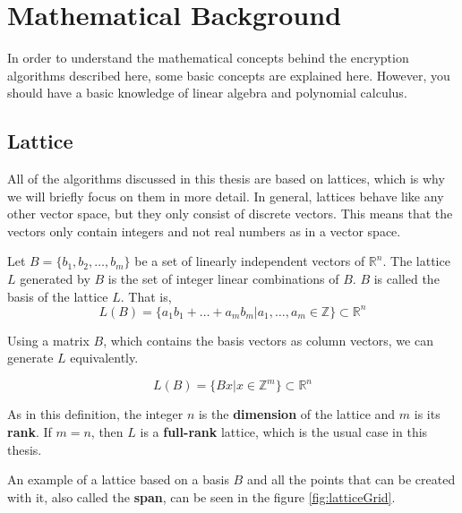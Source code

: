 \chapter{Mathematical Background}
\label{MathBack}

In order to understand the mathematical concepts behind the encryption algorithms described here, some basic concepts are explained here. However, you should have a basic knowledge of linear algebra and polynomial calculus.

\section{Lattice}


All of the algorithms discussed in this thesis are based on lattices, which is why we will briefly focus on them in more detail. In general, lattices behave like any other vector space, but they only consist of discrete vectors. This means that the vectors only contain integers and not real numbers as in a vector space.

Let $B = \{b_1, b_2, \ldots, b_m\}$ be a set of linearly independent vectors of $\mathbb{R}^n$. The lattice $L$ generated by $B$ is the set of integer linear combinations of $B$. $B$ is called the basis of the lattice $L$. That is,
$$L(B) = \{a_1b_1 + \ldots + a_mb_m | a_1, \ldots, a_m \in \mathbb{Z}  \} \subset \mathbb{R}^n$$


Using a matrix $B$, which contains the basis vectors as column vectors, we can generate $L$ equivalently.

$$L(B) = \{Bx | x \in \mathbb{Z}^m  \} \subset \mathbb{R}^n$$

As in this definition, the integer $n$ is the \textbf{dimension} of the lattice and $m$ is its \textbf{rank}. If $m = n$, then $L$ is a \textbf{full-rank} lattice, which is the usual case in this thesis. 

An example of a lattice based on a basis $B$ and all the points that can be created with it, also called the \textbf{span}, can be seen in the figure \ref{fig:latticeGrid}.

